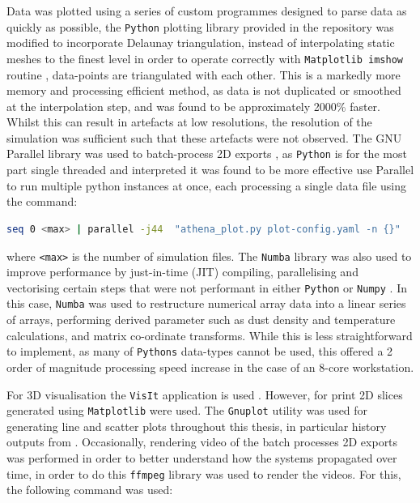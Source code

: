 Data was plotted using a series of custom programmes designed to parse data as quickly as possible, 
the \texttt{Python} plotting library provided in the \athena{} repository was modified to incorporate Delaunay triangulation, instead of interpolating static meshes to the finest level in order to operate correctly with \texttt{Matplotlib imshow} routine \parencite{Hunter:2007}, data-points are triangulated with each other.
This is a markedly more memory and processing efficient method, as data is not duplicated or smoothed at the interpolation step, and was found to be approximately 2000\% faster.
Whilst this can result in artefacts at low resolutions, the resolution of the simulation was sufficient such that these artefacts were not observed.
The GNU Parallel library was used to batch-process 2D exports \parencite{tange_2021_5523272}, as \texttt{Python} is for the most part single threaded and interpreted it was found to be more effective use Parallel to run multiple python instances at once, each processing a single data file using the command:

\begin{lstlisting}[language=bash]
seq 0 <max> | parallel -j44  "athena_plot.py plot-config.yaml -n {}"
\end{lstlisting}

\noindent
where \texttt{<max>} is the number of simulation files.
The \texttt{Numba} library \parencite{lam2015numba} was also used to improve performance by just-in-time (JIT) compiling, parallelising and vectorising certain steps that were not performant in either \texttt{Python} or \texttt{Numpy} \parencite{harris2020array}.
In this case, \texttt{Numba} was used to restructure numerical array data into a linear series of arrays, performing derived parameter such as dust density and temperature calculations, and matrix co-ordinate transforms.
While this is less straightforward to implement, as many of \texttt{Pythons} data-types cannot be used, this offered a 2 order of magnitude processing speed increase in the case of an 8-core workstation.

For 3D visualisation the \texttt{VisIt} application is used \parencite{HPV:VisIt}.
However, for print 2D slices generated using \texttt{Matplotlib} were used. 
The \texttt{Gnuplot} utility \parencite{gnuplot} was used for generating line and scatter plots throughout this thesis, in particular history outputs from \athena{}.
Occasionally, rendering video of the batch processes 2D exports was performed in order to better understand how the systems propagated over time, in order to do this \texttt{ffmpeg} library \parencite{tomar2006converting} was used to render the videos.
For this, the following command was used:

